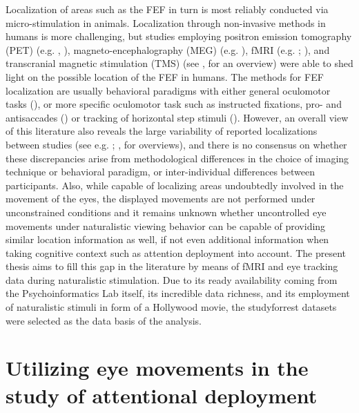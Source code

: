 \documentclass[a4paper, 12pt]{scrreprt}
\begin{document}
Localization of areas such as the FEF in turn is most reliably conducted via micro-stimulation in animals. Localization through non-invasive methods in humans is more challenging, but studies employing positron emission tomography (PET) (e.g. \textcite{paus1996location}, \cite{kawashima1998oculomotor}), magneto-encephalography (MEG) (e.g. \cite{ioannides2004meg}), fMRI (e.g. \cite{petit1999functional}; \cite{connolly2002human}), and transcranial magnetic stimulation (TMS) (see \textcite{vernet2014corrigendum}, for an overview) were able to shed light on the possible location of the FEF in humans. The methods for FEF localization are usually behavioral paradigms with either general oculomotor tasks (\cite{paus1996location}), or more specific oculomotor task such as instructed fixations, pro- and antisaccades (\cite{connolly2002human}) or tracking of horizontal step stimuli (\cite{alkan2011differentiation}). However, an overall view of this literature also reveals the large variability of reported localizations between studies (see e.g. \textcite{paus1996location}; \textcite{vernet2014corrigendum}, for overviews), and there is no consensus on whether these discrepancies arise from methodological differences in the choice of imaging technique or behavioral paradigm, or inter-individual differences between participants.  Also, while capable of localizing areas undoubtedly involved in the movement of the eyes, the displayed movements are not performed under unconstrained conditions and it remains unknown whether uncontrolled eye movements under naturalistic viewing behavior can be capable of providing similar location information as well, if not even additional information when taking cognitive context such as attention deployment into account.\newline
The present thesis aims to fill this gap in the literature by means of fMRI and eye tracking data during naturalistic stimulation. Due to its ready availability coming from the Psychoinformatics Lab itself, its incredible data richness, and its employment of naturalistic stimuli in form of a Hollywood movie, the studyforrest datasets were selected as the data basis of the analysis.

\section{Utilizing eye movements in the study of attentional deployment}\label{section:eyeutils}
\end{document}
